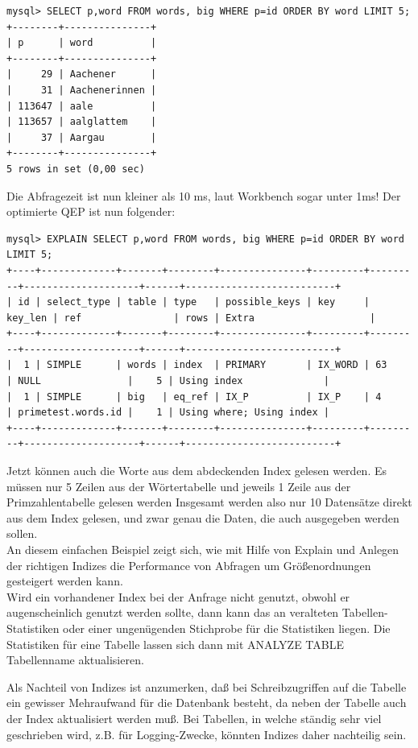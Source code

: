 \begin{lstlisting}
mysql> SELECT p,word FROM words, big WHERE p=id ORDER BY word LIMIT 5;
+--------+---------------+
| p      | word          |
+--------+---------------+
|     29 | Aachener      |
|     31 | Aachenerinnen |
| 113647 | aale          |
| 113657 | aalglattem    |
|     37 | Aargau        |
+--------+---------------+
5 rows in set (0,00 sec)
\end{lstlisting}
Die Abfragezeit ist nun kleiner als 10 ms, laut Workbench sogar unter 1ms! Der optimierte QEP ist nun folgender:
\begin{lstlisting}[basicstyle=\ttfamily\tiny]
mysql> EXPLAIN SELECT p,word FROM words, big WHERE p=id ORDER BY word LIMIT 5;
+----+-------------+-------+--------+---------------+---------+---------+--------------------+------+--------------------------+
| id | select_type | table | type   | possible_keys | key     | key_len | ref                | rows | Extra                    |
+----+-------------+-------+--------+---------------+---------+---------+--------------------+------+--------------------------+
|  1 | SIMPLE      | words | index  | PRIMARY       | IX_WORD | 63      | NULL               |    5 | Using index              |
|  1 | SIMPLE      | big   | eq_ref | IX_P          | IX_P    | 4       | primetest.words.id |    1 | Using where; Using index |
+----+-------------+-------+--------+---------------+---------+---------+--------------------+------+--------------------------+
\end{lstlisting}
Jetzt können auch die Worte aus dem abdeckenden Index gelesen werden. Es müssen nur 5 Zeilen aus der Wörtertabelle und jeweils 1 Zeile aus der Primzahlentabelle gelesen werden
Insgesamt werden also nur 10 Datensätze direkt aus dem Index gelesen, und zwar genau die Daten, die auch ausgegeben werden sollen.
\\An diesem einfachen Beispiel zeigt sich, wie mit Hilfe von Explain und Anlegen der richtigen Indizes die Performance von Abfragen um Größenordnungen gesteigert werden kann.
\\Wird ein vorhandener Index bei der Anfrage nicht genutzt, obwohl er augenscheinlich genutzt werden sollte, dann kann das an veralteten Tabellen-Statistiken oder einer ungenügenden Stichprobe für die Statistiken liegen. Die Statistiken für eine Tabelle lassen sich dann mit ANALYZE TABLE Tabellenname aktualisieren.

Als Nachteil von Indizes ist anzumerken, daß bei Schreibzugriffen auf die Tabelle ein gewisser Mehraufwand für die Datenbank besteht, da neben der Tabelle auch der Index aktualisiert werden muß. Bei Tabellen, in welche ständig sehr viel geschrieben wird, z.B. für Logging-Zwecke, könnten Indizes daher nachteilig sein.

